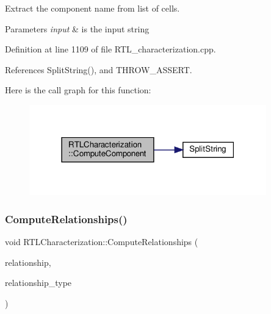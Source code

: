 Extract the component name from list of cells. 


\begin{DoxyParams}{Parameters}
{\em input} & is the input string \\
\hline
\end{DoxyParams}


Definition at line 1109 of file R\+T\+L\+\_\+characterization.\+cpp.



References Split\+String(), and T\+H\+R\+O\+W\+\_\+\+A\+S\+S\+E\+RT.

Here is the call graph for this function\+:
\nopagebreak
\begin{figure}[H]
\begin{center}
\leavevmode
\includegraphics[width=291pt]{d9/d84/classRTLCharacterization_ab22c0a668aea8294ea67188cc5e0846d_cgraph}
\end{center}
\end{figure}
\mbox{\label{classRTLCharacterization_acb29748095419798f3ff059e7b00099f}} 
\subsubsection{\texorpdfstring{Compute\+Relationships()}{ComputeRelationships()}}
{\footnotesize\ttfamily void R\+T\+L\+Characterization\+::\+Compute\+Relationships (\begin{DoxyParamCaption}\item[{\hyperlink{classDesignFlowStepSet}{Design\+Flow\+Step\+Set} \&}]{relationship,  }\item[{const \hyperlink{classDesignFlowStep_a723a3baf19ff2ceb77bc13e099d0b1b7}{Design\+Flow\+Step\+::\+Relationship\+Type}}]{relationship\+\_\+type }\end{DoxyParamCaption})\hspace{0.3cm}{\ttfamily [virtual]}}



